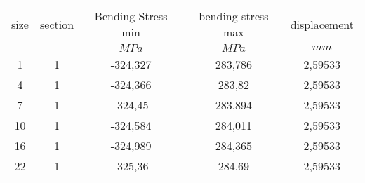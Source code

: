 
\begin{tabular}{ccccc}
\hline
size 	& section	& Bending Stress min 	&	bending stress max	&	displacement\\
		&			& $MPa$					& 	$MPa$				& $mm$\\
\hline
1		&	1		&-324,327				&	283,786				&	2,59533\\
4		&	1		&-324,366				&	283,82				&	2,59533\\
7		&	1  		& -324,45				&	283,894				&	2,59533\\
10		&	1		&-324,584				&	284,011				&	2,59533\\
16		&	1		&-324,989				&	284,365				&	2,59533\\
22		&	1		&-325,36				&	284,69				&	2,59533\\
\hline
\end{tabular}
